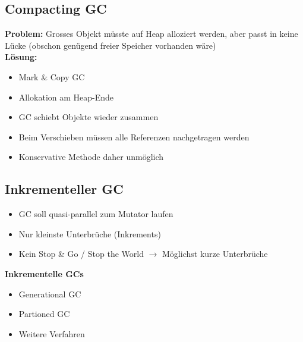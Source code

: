 \subsection{Compacting GC}
\textbf{Problem:} Grosses Objekt müsste auf Heap alloziert werden, aber passt in keine Lücke (obschon genügend freier Speicher vorhanden wäre)\\
\textbf{Lösung:}
\begin{itemize}[topsep=0pt]
    \itemsep -0.2em
    \item Mark \& Copy GC
    \item Allokation am Heap-Ende
    \item GC schiebt Objekte wieder zusammen
    \item Beim Verschieben müssen alle Referenzen nachgetragen werden
    \item Konservative Methode daher unmöglich
\end{itemize}

\subsection{Inkrementeller GC}
\begin{itemize}[topsep=0pt]
    \itemsep -0.2em
    \item GC soll quasi-parallel zum Mutator laufen
    \item Nur kleinste Unterbrüche (Inkrements)
    \item Kein Stop \& Go / Stop the World $\rightarrow$ Möglichst kurze Unterbrüche
\end{itemize}

\textbf{Inkrementelle GCs}
\begin{itemize}[topsep=0pt]
    \itemsep -0.2em
    \item Generational GC
    \item Partioned GC
    \item Weitere Verfahren
\end{itemize}


